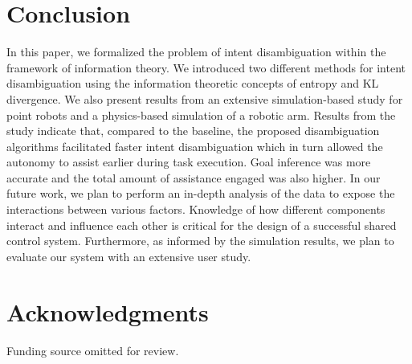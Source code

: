 \documentclass[conference]{IEEEtran}
\begin{document}

\section{Conclusion}\label{sec:conclusions}
In this paper, we formalized the problem of intent disambiguation within the framework of information theory. We introduced two different methods for intent disambiguation using the information theoretic concepts of entropy and KL divergence. We also present results from an extensive simulation-based study for point robots and a physics-based simulation of a robotic arm. Results from the study indicate that, compared to the baseline, the proposed disambiguation algorithms facilitated faster intent disambiguation which in turn allowed the autonomy to assist earlier during task execution. Goal inference was more accurate and the total amount of assistance engaged was also higher. In our future work, we plan to perform an in-depth analysis of the data to expose the interactions between various factors. Knowledge of how different components interact and influence each other is critical for the design of a successful shared control system. Furthermore, as informed by the simulation results, we plan to evaluate our system with an extensive user study. 

\section*{Acknowledgments}
Funding source omitted for review. 
\balance


\end{document}
